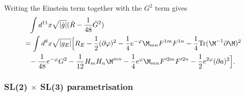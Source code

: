 Writing the Einstein term together with the $G^2$ term gives
\begin{align}
&\phantom{=}\int d^{11}x \sqrt{|\hat{g}|} (\hat{R}-{1 \over 48}\hat{G}^2) \nonumber \\
&= \int d^8x \sqrt{|g_E|} \Big{[} R_E - {1 \over 2}(\partial \varphi)^2-{1 \over 4}e^{-\varphi}\M_{mn}F^{1m}F^{1n} -{1 \over 4}\mbox{Tr}(\M^{-1}\partial \M)^2 \nonumber \\
&\phantom{=}- {1 \over 48}e^{-\varphi}G^2 - {1 \over 12}H_mH_n\M^{mn} - {1 \over 4}e^{\varphi}\M_{mn}F'^{2m}F'^{2n} - {1 \over 2}e^{2\varphi}(\partial a)^2 \Big{]}.
\label{hej2}
\end{align}

\subsubsection{SL(2) $\times$ SL(3) parametrisation}

